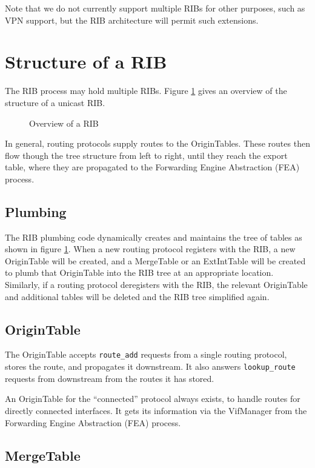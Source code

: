 \documentclass[11pt]{article}
\begin{document}
Note that we do not currently support multiple RIBs for other
purposes, such as VPN support, but the RIB architecture will permit
such extensions.
\section{Structure of a RIB}
The RIB process may hold multiple RIBs.  Figure \ref{overview} gives
an overview of the structure of a unicast RIB.
\begin{figure}[htb]
\centerline{}
\vspace{.05in}
\caption{\label{overview}Overview of a RIB}
\end{figure}
In general, routing protocols supply routes to the OriginTables.
These routes then flow though the tree structure from left to right,
until they reach the export table, where they are propagated to the
Forwarding Engine Abstraction (FEA) process.

\subsection{Plumbing}

The RIB plumbing code dynamically creates and maintains the tree of
tables as shown in figure \ref{overview}.  When a new routing protocol
registers with the RIB, a new OriginTable will be created, and a
MergeTable or an ExtIntTable will be created to plumb that OriginTable
into the RIB tree at an appropriate location.  Similarly, if a routing
protocol deregisters with the RIB, the relevant OriginTable and
additional tables will be deleted and the RIB tree simplified again.

\subsection{OriginTable}

The OriginTable accepts {\tt route\_add} requests from a single routing
protocol, stores the route, and propagates it downstream.  It also
answers {\tt lookup\_route} requests from downstream from the routes it
has stored.

An OriginTable for the ``connected'' protocol always exists, to handle
routes for directly connected interfaces.  It gets its information
via the VifManager from the Forwarding Engine Abstraction (FEA)
process.

\subsection{MergeTable}
\end{document}
